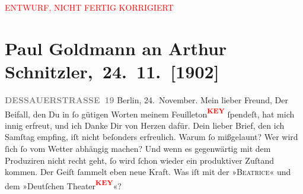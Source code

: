
\begin{center}
            \textcolor{red}{ENTWURF, NICHT FERTIG KORRIGIERT}
                      \end{center}
            
         \renewcommand{\erwaehnteOrte}{Orte: Berlin, Dessauer Straße, Wien}
         \renewcommand{\erwaehnteWerke}{Werke: Der Schleier der Beatrice. Schauspiel in fünf Akten}
               \section[ Paul Goldmann an Arthur Schnitzler, 24. 11. {[}1902{]}]{ Paul Goldmann an Arthur Schnitzler, 24. 11. {[}1902{]}}\nopagebreak{}\rehead{ }\begin{ledgroupsized}[t]{13cm}\normalsize\beginnumbering \toendnotes[C]{\smallbreak\pagebreak[2]} 
\pstart
           \noindent{}\raggedleft{}{\pb}\textcolor{gray}{\textbf{DESSAUERSTRASSE 19}}\pend
           \pstart
           Berlin, 24. November.\pend
           \pstart\center{}Mein lieber Freund,\pend\pstart
           Der Beifall, den Du in ſo gütigen Worten meinem Feuilleton\textcolor{red}{\textsuperscript{\textbf{KEY}}} ſpendeſt, hat mich innig erfreut, und ich Danke Dir von
                    Herzen dafür. \pend
           \pstart
           Dein lieber Brief, den ich Samſtag empfing, iſt nicht beſonders
                    erfreulich. Warum ſo mißgelaunt? Wer wird ſich ſo vom Wetter abhängig machen?
                    Und wenn es gegenwärtig mit dem Produziren nicht recht geht, ſo wird ſchon {\pb} wieder ein produktiver Zuſtand kommen. Der
                    Geiſt ſammelt eben neue Kraft. \pend
           \pstart
           Was iſt mit der »\textsc{Beatrice}« und dem »Deutſchen Theater\textcolor{red}{\textsuperscript{\textbf{KEY}}}«? \pend

\end{ledgroupsized}
